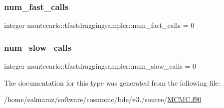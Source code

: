 \subsubsection{\texorpdfstring{num\+\_\+fast\+\_\+calls}{num\_fast\_calls}}
{\footnotesize\ttfamily integer montecarlo\+::tfastdraggingsampler\+::num\+\_\+fast\+\_\+calls = 0\hspace{0.3cm}{\ttfamily [private]}}

\mbox{\label{structmontecarlo_1_1tfastdraggingsampler_a8b923ef4ecd8c5258b53e7088a52756c}} 
\subsubsection{\texorpdfstring{num\+\_\+slow\+\_\+calls}{num\_slow\_calls}}
{\footnotesize\ttfamily integer montecarlo\+::tfastdraggingsampler\+::num\+\_\+slow\+\_\+calls = 0\hspace{0.3cm}{\ttfamily [private]}}



The documentation for this type was generated from the following file\+:\begin{DoxyCompactItemize}
\item 
/home/ealmaraz/software/cosmomc/bde/v3./source/\mbox{\hyperlink{MCMC_8f90}{M\+C\+M\+C.\+f90}}\end{DoxyCompactItemize}
